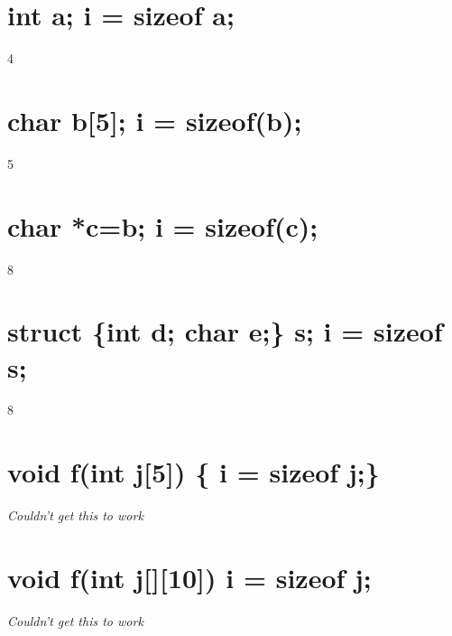 \documentclass{supervision}
\begin{document}
\begin{questions}
\begin{parts}
        \part{int a; i = sizeof a;}
        \begin{solution}
        4
        \end{solution}
        \part{char b[5]; i = sizeof(b);}
        \begin{solution}
        5
        \end{solution}
        \part{char *c=b; i = sizeof(c);}
        \begin{solution}
        8
        \end{solution}
        \part{struct \{int d; char e;\} s; i = sizeof s;}
        \begin{solution}
        8
        \end{solution}
        \part{void f(int j[5]) \{ i = sizeof j;\}}
        \begin{solution}
        \textit{Couldn't get this to work}
        \end{solution}
        \part{void f(int j[][10]) { i = sizeof j;}}
        \begin{solution}
        \textit{Couldn't get this to work}
        \end{solution}
    \end{parts}
\end{questions}
\end{document}

